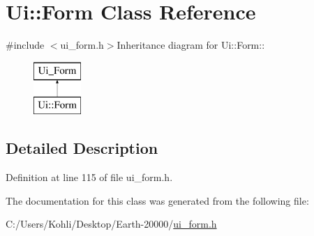 \hypertarget{class_ui_1_1_form}{
\section{Ui::Form Class Reference}
\label{class_ui_1_1_form}
}


{\ttfamily \#include $<$ui\_\-form.h$>$}Inheritance diagram for Ui::Form::\begin{figure}[H]
\begin{center}
\leavevmode
\includegraphics[height=2cm]{class_ui_1_1_form}
\end{center}
\end{figure}


\subsection{Detailed Description}


Definition at line 115 of file ui\_\-form.h.

The documentation for this class was generated from the following file:\begin{DoxyCompactItemize}
\item 
C:/Users/Kohli/Desktop/Earth-\/20000/\hyperlink{ui__form_8h}{ui\_\-form.h}\end{DoxyCompactItemize}
